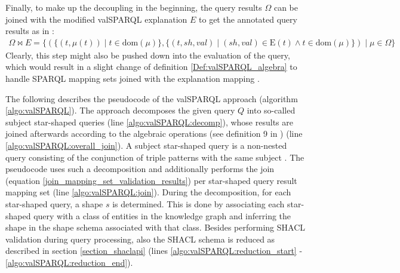     Finally, to make up the decoupling in the beginning, the query results $\Omega$ can be joined with the modified valSPARQL explanation $E$ to get the annotated query results as in \cite{valSPARQL}:
    \begin{gather}
    \Omega \bowtie E = \{(\{(t, \mu(t)) \mid t \in \text{dom}(\mu)\}, \{(t,sh,val) \mid (sh, val) \in \text{E}(t) \land t \in \text{dom}(\mu)\} ) \mid \mu \in \Omega\} \label{join_mapping_set_validation_results}
    \end{gather}
    Clearly, this step might also be pushed down into the evaluation of the query, which would result in a slight change of definition \ref{Def:valSPARQL_algebra} to handle SPARQL mapping sets joined with the explanation mapping \cite{valSPARQL}. 
        
    The following describes the pseudocode of the valSPARQL approach (algorithm \ref{algo:valSPARQL}).
    The approach decomposes the given query $Q$ into so-called subject star-shaped queries (line \ref{algo:valSPARQL:decomp}), whose results are joined afterwards according to the algebraic operations (see definition 9 in \cite{valSPARQL}) (line \ref{algo:valSPARQL:overall_join}). A subject star-shaped query is a non-nested query consisting of the conjunction of triple patterns with the same subject \cite{vidal2010efficiently}. The pseudocode uses such a decomposition and additionally performs the join (equation \ref{join_mapping_set_validation_results}) per star-shaped query result mapping set (line \ref{algo:valSPARQL:join}). During the decomposition, for each star-shaped query, a shape $s$ is determined. This is done by associating each star-shaped query with a class of entities in the knowledge graph and inferring the shape in the shape schema associated with that class. 
    Besides performing SHACL validation during query processing, also the SHACL schema is reduced as described in section \ref{section_shaclapi} (lines \ref{algo:valSPARQL:reduction_start} - \ref{algo:valSPARQL:reduction_end}). 
    
